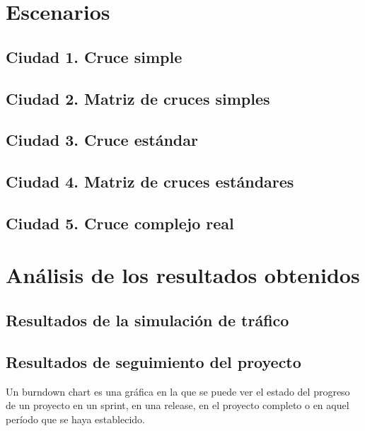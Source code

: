 \chapter{Escenarios}
    \label{chap:six}
    
\section{Ciudad 1. Cruce simple}
\section{Ciudad 2. Matriz de cruces simples}
\section{Ciudad 3. Cruce estándar}
\section{Ciudad 4. Matriz de cruces estándares}
\section{Ciudad 5. Cruce complejo real}


\chapter{Análisis de los resultados obtenidos}
    \label{chap:seven}
    
\section{Resultados de la simulación de tráfico}

\newpage
\section{Resultados de seguimiento del proyecto}
Un burndown chart es una gráfica en la que se puede ver el estado del progreso de un proyecto en un sprint, en una release, en el proyecto completo o en aquel período que se haya establecido.

